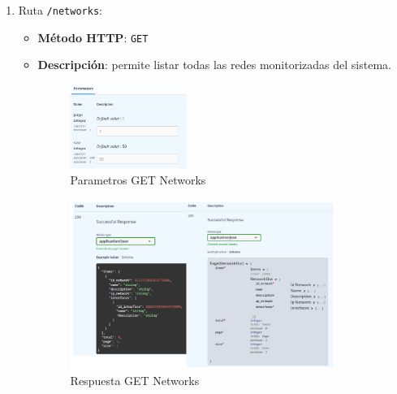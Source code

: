 \documentclass[a4paper, oneside, 12pt]{book}
\begin{document}
	\begin{enumerate}
		\item Ruta \texttt{/networks}:
		
		\begin{itemize}
			\item \textbf{Método HTTP}: \texttt{GET}
			\item \textbf{Descripción}: permite listar todas las redes monitorizadas del sistema.
			
			\begin{figure}[h!]
				\begin{center}
					\includegraphics[width=0.38\textwidth]{img/parameters_get_networks.png}
					\caption{Parametros GET Networks}
					\label{img: parameters get networks}
				\end{center}
			\end{figure}
			
			\begin{figure}[h!]
				\begin{center}
					\includegraphics[width=0.87\textwidth]{diag/response_get_networks.png}
					\caption{Respuesta GET Networks}
					\label{img: response get networks}
				\end{center}
			\end{figure}
		
		\end{itemize}
	

\end{enumerate}
\end{document}
